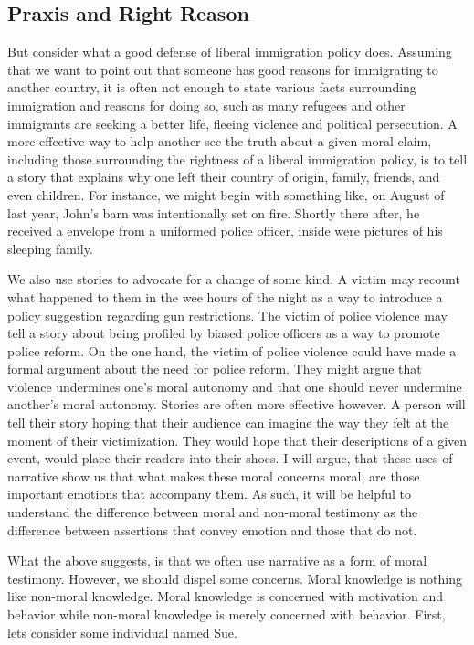\documentclass[phdthesis,12pt,final]{wuthesis}
\theoremstyle{definition}
\theoremstyle{definition}
\theoremstyle{definition}
\theoremstyle{definition}
\theoremstyle{remark}
\begin{document}
\subsection*{Praxis and Right Reason}\label{praxis-and-right-reason}

But consider what a good defense of liberal immigration policy does. Assuming that we want to point out that someone has good reasons for immigrating to another country, it is often not enough to state various facts surrounding immigration and reasons for doing so, such as many refugees and other immigrants are seeking a better life, fleeing violence and political persecution. A more effective way to help another see the truth about a given moral claim, including those surrounding the rightness of a liberal immigration policy, is to tell a story that explains why one left their country of origin, family, friends, and even children. For instance, we might begin with something like, on August of last year, John's barn was intentionally set on fire. Shortly there after, he received a envelope from a uniformed police officer, inside were pictures of his sleeping family.

We also use stories to advocate for a change of some kind. A victim may recount what happened to them in the wee hours of the night as a way to introduce a policy suggestion regarding gun restrictions. The victim of police violence may tell a story about being profiled by biased police officers as a way to promote police reform. On the one hand, the victim of police violence could have made a formal argument about the need for police reform. They might argue that violence undermines one's moral autonomy and that one should never undermine another's moral autonomy. Stories are often more effective however. A person will tell their story hoping that their audience can imagine the way they felt at the moment of their victimization. They would hope that their descriptions of a given event, would place their readers into their shoes. I will argue, that these uses of narrative show us that what makes these moral concerns moral, are those important emotions that accompany them. As such, it will be helpful to understand the difference between moral and non-moral testimony as the difference between assertions that convey emotion and those that do not.

What the above suggests, is that we often use narrative as a form of moral testimony. However, we should dispel some concerns. Moral knowledge is nothing like non-moral knowledge. Moral knowledge is concerned with motivation and behavior while non-moral knowledge is merely concerned with behavior. First, lets consider some individual named Sue.
\end{document}
